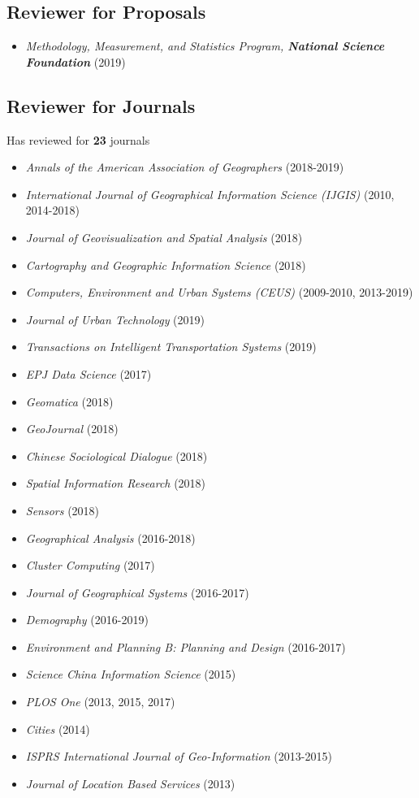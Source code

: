 \documentclass[11pt, a4paper]{article}
\begin{document}
\subsection*{Reviewer for Proposals}
\begin{itemize}
  \setlength\itemsep{0em}
  \item \emph{Methodology, Measurement, and Statistics Program, \textbf{National Science Foundation}} (2019)  
\end{itemize} 


\subsection*{Reviewer for Journals}
Has reviewed for \textbf{23} journals
\begin{itemize}
  \setlength\itemsep{0em}
  \item \emph{Annals of the American Association of Geographers} (2018-2019)  
  \item \emph{International Journal of Geographical Information Science (IJGIS)} (2010, 2014-2018)
  \item \emph{Journal of Geovisualization and Spatial Analysis} (2018)
  \item \emph{Cartography and Geographic Information Science} (2018)
  \item \emph{Computers, Environment and Urban Systems (CEUS)} (2009-2010, 2013-2019)
  \item \emph{Journal of Urban Technology} (2019)
  \item \emph{Transactions on Intelligent Transportation Systems} (2019)
  \item \emph{EPJ Data Science} (2017)
  \item \emph{Geomatica} (2018)
  \item \emph{GeoJournal} (2018)
  \item \emph{Chinese Sociological Dialogue} (2018)
  \item \emph{Spatial Information Research} (2018)
  \item \emph{Sensors} (2018)
  \item \emph{Geographical Analysis} (2016-2018)
  \item \emph{Cluster Computing} (2017)
  \item \emph{Journal of Geographical Systems} (2016-2017)
  \item \emph{Demography} (2016-2019)
  \item \emph{Environment and Planning B: Planning and Design} (2016-2017)
  \item \emph{Science China Information Science} (2015)
  \item \emph{PLOS One} (2013, 2015, 2017)
  \item \emph{Cities} (2014)
  \item \emph{ISPRS International Journal of Geo-Information} (2013-2015)
  \item \emph{Journal of Location Based Services} (2013)
\end{itemize} 
\end{document}
